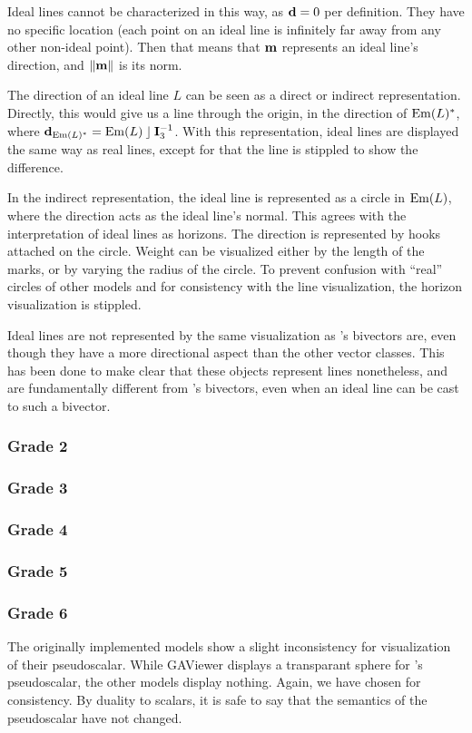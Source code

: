 Ideal lines cannot be characterized in this way, as $\mathbf{d} = 0$ per definition.  They have no specific location (each point on an ideal line is infinitely far away from any other non-ideal point).  Then that means that $\mathbf{m}$ represents an ideal line's direction, and $\left\|\mathbf{m}\right\|$ is its norm.

The direction of an ideal line $L$ can be seen as a direct or indirect representation.  Directly, this would give us a line through the origin, in the direction of $\operatorname{Em}(L)^\ast$, where $\mathbf{d}_{\operatorname{Em}(L)^\ast} = \operatorname{Em}(L) \mathbin{\rfloor} \mathbf{I}_3^{-1}$.  With this representation, ideal lines are displayed the same way as real lines, except for that the line is stippled to show the difference. 

In the indirect representation, the ideal line is represented as a circle in $\operatorname{Em}(L)$, where the direction acts as the ideal line's normal.  This agrees with the interpretation of ideal lines as horizons.  The direction is represented by hooks attached on the circle.  Weight can be visualized either by the length of the marks, or by varying the radius of the circle.  To prevent confusion with ``real'' circles of other models and for consistency with the line visualization, the horizon visualization is stippled.

Ideal lines are not represented by the same visualization as \ega's bivectors are, even though they have a more directional aspect than the other vector classes.  This has been done to make clear that these objects represent lines nonetheless, and are fundamentally different from \ega's bivectors, even when an ideal line can be cast to such a bivector.



\subsubsection{Grade 2}


\subsubsection{Grade 3}


\subsubsection{Grade 4}


\subsubsection{Grade 5}


\subsubsection{Grade 6}
The originally implemented models show a slight inconsistency for visualization of their pseudoscalar.  While GAViewer displays a transparant sphere for \ega{}'s pseudoscalar, the other models display nothing.  Again, we have chosen for consistency.  By duality to scalars, it is safe to say that the semantics of the pseudoscalar have not changed.
